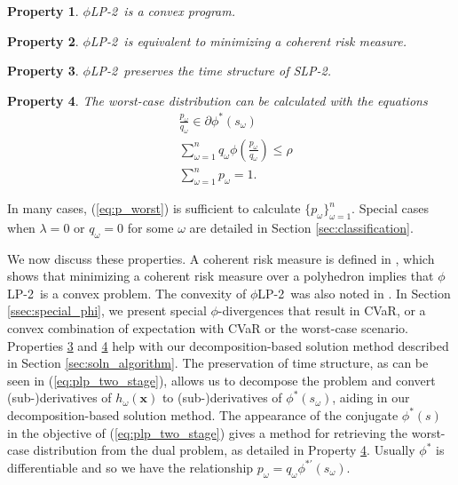 \documentclass[ijoc,letterpaper]{informs3} %
\newcommand{\x}{\mathbf{x}}
\newtheorem{property}{Property}
\newcommand{\plp}{$\phi$LP-2}
\begin{document}
\begin{property}
	\label{property:convex}
	\plp\ is a convex program.
\end{property}

\begin{property}
	\label{property:coherent_risk_measure}
	\plp\ is equivalent to minimizing a coherent risk measure.
\end{property}

\begin{property}
	\label{property:time_structure}
	\plp\ preserves the time structure of SLP-2.
\end{property}

\begin{property}
	\label{property:primal_dual_relation}
	The worst-case distribution can be calculated with the equations
	\begin{align} 
		& \frac{p_\omega}{q_\omega} \in \partial \phi^*\left(s_\omega\right) \label{eq:p_worst} \\
		& \sum_{\omega=1}^n q_\omega \phi\left(\frac{p_\omega}{q_\omega}\right) \leq \rho \nonumber \\
		& \sum_{\omega=1}^n p_\omega = 1. \nonumber
	\end{align}
\end{property}
In many cases, (\ref{eq:p_worst}) is sufficient to calculate $\{p_\omega\}_{\omega=1}^n$.
Special cases when $\lambda = 0$ or $q_\omega = 0$ for some $\omega$ are detailed in Section \ref{sec:classification}.

We now discuss these properties. A coherent risk measure is defined in \citep{rockafellar2007coherent}, which shows that minimizing a coherent risk measure over a polyhedron implies that \plp\ is a convex problem.
The convexity of \plp\ was also noted in \citep{bental2011robust}.
In Section \ref{ssec:special_phi}, we present special $\phi$-divergences that result in CVaR, or a convex combination of expectation with CVaR or the worst-case scenario. 
Properties \ref{property:time_structure} and \ref{property:primal_dual_relation} help with our decomposition-based solution method described in Section \ref{sec:soln_algorithm}. 
The preservation of time structure, as can be seen in (\ref{eq:plp_two_stage}), allows us to decompose the problem and convert (sub-)derivatives of $h_\omega(\x)$ to (sub-)derivatives of $\phi^*\left(s_\omega\right)$, aiding in our decomposition-based solution method. 
The appearance of the conjugate $\phi^*(s)$ in the objective of (\ref{eq:plp_two_stage}) gives a method for retrieving the worst-case distribution from the dual problem, as detailed in Property \ref{property:primal_dual_relation}.  
Usually $\phi^*$ is differentiable and so we have the relationship $p_\omega = q_\omega \phi^{* \prime}(s_\omega)$.
\end{document}

